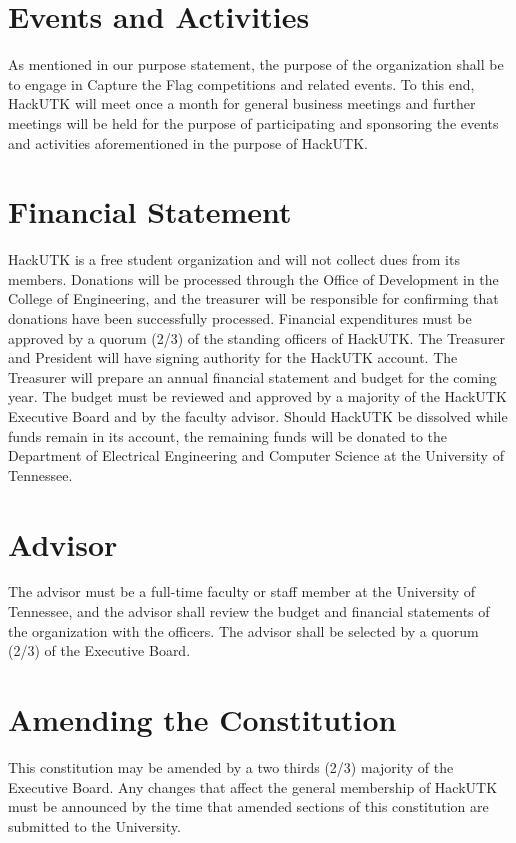 \documentclass[12pt]{article}
\begin{document}
\section{Events and Activities}
As mentioned in our purpose statement, the purpose of the organization shall be to engage in Capture the Flag competitions and related events. To this end, HackUTK will meet once a month for general business meetings and further meetings will be held for the purpose of participating and sponsoring the events and activities aforementioned in the purpose of HackUTK.

\section*{Financial Statement}
HackUTK is a free student organization and will not collect dues from its members. Donations will be processed through the Office of Development in the College of Engineering, and the treasurer will be responsible for confirming that donations have been successfully processed. Financial expenditures must be approved by a quorum (2/3) of the standing officers of HackUTK. The Treasurer and President will have signing authority for the HackUTK account. The Treasurer will prepare an annual financial statement and budget for the coming year. The budget must be reviewed and approved by a majority of the HackUTK Executive Board and by the faculty advisor. Should HackUTK be dissolved while funds remain in its account, the remaining funds will be donated to the Department of Electrical Engineering and Computer Science at the University of Tennessee.

\section{Advisor}
The advisor must be a full-time faculty or staff member at the University of Tennessee, and the advisor shall review the budget and financial statements of the organization with the officers. The advisor shall be selected by a quorum (2/3) of the Executive Board.

\section{Amending the Constitution}
This constitution may be amended by a two thirds (2/3) majority of the Executive
Board. Any changes that affect the general membership of HackUTK must be
announced by the time that amended sections of this constitution are submitted to the University.
\end{document}

